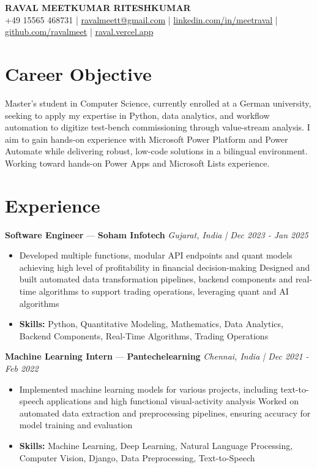 \documentclass[a4paper,10pt]{article}
\begin{document}
\begin{center}
  {\Large\bfseries RAVAL MEETKUMAR RITESHKUMAR}\\[2pt]
  {\small +49 15565 468731 \;|\; \href{mailto:ravalmeett@gmail.com}{ravalmeett@gmail.com} \;|\; \href{https://www.linkedin.com/in/meetraval/}{linkedin.com/in/meetraval} \;|\; \href{https://github.com/ravalmeet}{github.com/ravalmeet} \;|\; \href{https://raval.vercel.app/}{raval.vercel.app}}
\end{center}
\vspace{-3pt}

\section*{Career Objective}
Master's student in Computer Science, currently enrolled at a German university, seeking to apply my expertise in Python, data analytics, and workflow automation to digitize test-bench commissioning through value-stream analysis. I aim to gain hands-on experience with Microsoft Power Platform and Power Automate while delivering robust, low-code solutions in a bilingual environment. Working toward hands-on Power Apps and Microsoft Lists experience.\par

\section*{Experience}
\textbf{Software Engineer} — \textbf{Soham Infotech} \hfill \textit{Gujarat, India \;|\; Dec 2023 - Jan 2025}\par
\vspace{1pt}
\begin{itemize}
  \item Developed multiple functions, modular API endpoints and quant models achieving high level of profitability in financial decision-making Designed and built automated data transformation pipelines, backend components and real-time algorithms to support trading operations, leveraging quant and AI algorithms
  \item \textbf{Skills:} Python, Quantitative Modeling, Mathematics, Data Analytics, Backend Components, Real-Time Algorithms, Trading Operations
\end{itemize}
\vspace{3pt}
\textbf{Machine Learning Intern} — \textbf{Pantechelearning} \hfill \textit{Chennai, India \;|\; Dec 2021 - Feb 2022}\par
\vspace{1pt}
\begin{itemize}
  \item Implemented machine learning models for various projects, including text-to-speech applications and high functional visual-activity analysis Worked on automated data extraction and preprocessing pipelines, ensuring accuracy for model training and evaluation
  \item \textbf{Skills:} Machine Learning, Deep Learning, Natural Language Processing, Computer Vision, Django, Data Preprocessing, Text-to-Speech
\end{itemize}
\end{document}
